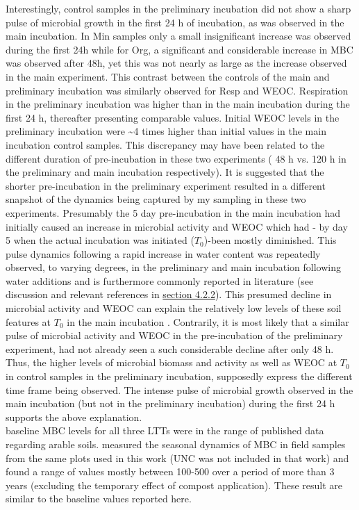 	Interestingly, control samples in the preliminary incubation did not show a sharp pulse of microbial growth in the first 24 h of incubation, as was observed in the main incubation. In Min samples only a small insignificant increase was observed during the first 24h while for Org, a significant and considerable increase in MBC was observed after 48h, yet this was  not nearly as large as the increase observed in the main experiment. This contrast between the controls of the main and preliminary incubation was similarly observed for Resp and WEOC. Respiration in the preliminary incubation was higher than in the main incubation during the first 24 h, thereafter presenting comparable values. Initial WEOC levels in the preliminary incubation were \~{}4 times higher than initial values in the main incubation control samples. This discrepancy may have been related to the different duration of pre-incubation in these two experiments ( 48 h vs. 120 h in the preliminary and main incubation respectively). It is suggested that the shorter pre-incubation in the preliminary experiment resulted in a different snapshot of the dynamics being captured by my sampling in these two experiments. Presumably the 5 day pre-incubation in the main incubation had initially caused an increase in microbial activity and WEOC which had - by day 5 when the actual incubation was initiated ($ T_0 $)-been mostly diminished. This pulse dynamics following a rapid increase in water content was repeatedly observed, to varying degrees, in the preliminary and main incubation following water additions and is furthermore commonly reported in literature (see discussion and relevant references in  \hyperref[subsection_4.2.2]{section 4.2.2}). This presumed decline in microbial activity and WEOC can explain the relatively low levels of these soil features at $ T_0 $ in the main incubation . Contrarily, it is most likely that a similar pulse of microbial activity and WEOC in the pre-incubation of the preliminary experiment, had not already seen a such considerable decline after only 48 h. Thus, the higher levels of microbial biomass and activity as well as WEOC at $ T_0 $ in control samples in the preliminary incubation, supposedly express the different time frame being observed. The intense pulse of microbial growth observed in the main incubation (but not in the preliminary incubation) during the first 24 h supports the above explanation.\\
	baseline MBC levels for all three LTTs were in the range of published data regarding arable soils\citep{gonzalez-quinones2011}. \citet{rotbart2018} measured the seasonal dynamics of MBC in field samples from the same plots used in this work (UNC was not included in that work) and found a range of values mostly between 100-500 \genericunit over a period of more than 3 years (excluding the temporary effect of compost application). These result are similar to the baseline values reported here.
